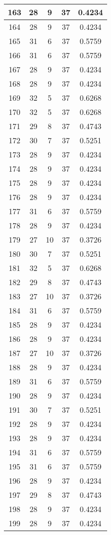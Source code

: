 \documentclass[letterpaper, 12pt]{article}
\begin{document}
\begin{longtable}{|c|c|c|c|c|}
\hline
163 & 28 & 9 & 37 & 0.4234 \\
\hline
164 & 28 & 9 & 37 & 0.4234 \\
\hline
165 & 31 & 6 & 37 & 0.5759 \\
\hline
166 & 31 & 6 & 37 & 0.5759 \\
\hline
167 & 28 & 9 & 37 & 0.4234 \\
\hline
168 & 28 & 9 & 37 & 0.4234 \\
\hline
169 & 32 & 5 & 37 & 0.6268 \\
\hline
170 & 32 & 5 & 37 & 0.6268 \\
\hline
171 & 29 & 8 & 37 & 0.4743 \\
\hline
172 & 30 & 7 & 37 & 0.5251 \\
\hline
173 & 28 & 9 & 37 & 0.4234 \\
\hline
174 & 28 & 9 & 37 & 0.4234 \\
\hline
175 & 28 & 9 & 37 & 0.4234 \\
\hline
176 & 28 & 9 & 37 & 0.4234 \\
\hline
177 & 31 & 6 & 37 & 0.5759 \\
\hline
178 & 28 & 9 & 37 & 0.4234 \\
\hline
179 & 27 & 10 & 37 & 0.3726 \\
\hline
180 & 30 & 7 & 37 & 0.5251 \\
\hline
181 & 32 & 5 & 37 & 0.6268 \\
\hline
182 & 29 & 8 & 37 & 0.4743 \\
\hline
183 & 27 & 10 & 37 & 0.3726 \\
\hline
184 & 31 & 6 & 37 & 0.5759 \\
\hline
185 & 28 & 9 & 37 & 0.4234 \\
\hline
186 & 28 & 9 & 37 & 0.4234 \\
\hline
187 & 27 & 10 & 37 & 0.3726 \\
\hline
188 & 28 & 9 & 37 & 0.4234 \\
\hline
189 & 31 & 6 & 37 & 0.5759 \\
\hline
190 & 28 & 9 & 37 & 0.4234 \\
\hline
191 & 30 & 7 & 37 & 0.5251 \\
\hline
192 & 28 & 9 & 37 & 0.4234 \\
\hline
193 & 28 & 9 & 37 & 0.4234 \\
\hline
194 & 31 & 6 & 37 & 0.5759 \\
\hline
195 & 31 & 6 & 37 & 0.5759 \\
\hline
196 & 28 & 9 & 37 & 0.4234 \\
\hline
197 & 29 & 8 & 37 & 0.4743 \\
\hline
198 & 28 & 9 & 37 & 0.4234 \\
\hline
199 & 28 & 9 & 37 & 0.4234 \\
\hline
\end{longtable}
\end{document}

